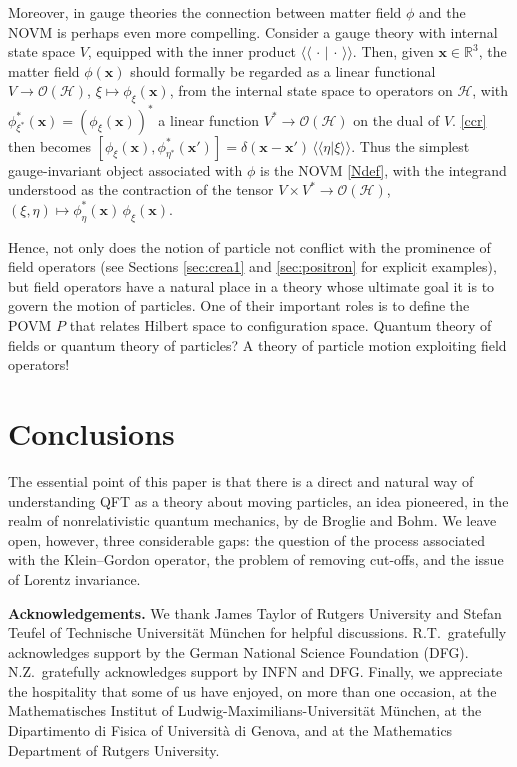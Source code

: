 \documentclass[12pt]{article}
\newcommand{\RRR}{\mathbb{R}} %
\newcommand{\1}{\mathbf{1}} %
\newcommand{\Hilbert}{\mathscr{H}}
\newcommand{\scalar}[2]{\langle\!\langle #1 | #2 \rangle\!\rangle} %
\newcommand{\pov}{{P}}%
\newcommand{\vx}{{\boldsymbol x}} %
\begin{document}
Moreover, in gauge theories the connection between matter field $\phi$
and the NOVM is perhaps even more compelling. Consider a gauge theory
with internal state space $V$, equipped with the inner product
$\scalar{\,\cdot\,}{\,\cdot\,}$. Then, given $\vx \in \RRR^3$, the
matter field $\phi(\vx)$ should formally be regarded as a linear
functional $V \to \mathcal{O}(\Hilbert)$, $\xi \mapsto \phi_\xi(\vx)$,
from the internal state space to operators on $\Hilbert$, with
$\phi^*_{\xi^*}(\vx) = (\phi_\xi(\vx))^*$ a linear function $V^* \to
\mathcal{O}(\Hilbert)$ on the dual of $V$. \eqref{ccr} then becomes
$[\phi_\xi(\vx), \phi_{\eta^*}^*(\vx')] = \delta(\vx-\vx') \,
\scalar{\eta}{\xi}$. Thus the simplest gauge-invariant object
associated with $\phi$ is the NOVM \eqref{Ndef}, with the integrand
understood as the contraction of the tensor $V \times V^* \to
\mathcal{O}(\Hilbert)$, $(\xi,\eta) \mapsto \phi_\eta^*(\vx) \,
\phi_\xi(\vx)$.

Hence, not only does the notion of particle not conflict with the
prominence of field operators (see Sections \ref{sec:crea1} and
\ref{sec:positron} for explicit examples), but field operators have a
natural place in a theory whose ultimate goal it is to govern the
motion of particles.  One of their important roles is to define the
POVM $\pov$ that relates Hilbert space to configuration space.
Quantum theory of fields or quantum theory of particles? A theory of
particle motion exploiting field operators!





\section{Conclusions}

The essential point of this paper is that there is a direct and
natural way of understanding QFT as a theory about moving particles,
an idea pioneered, in the realm of nonrelativistic quantum mechanics,
by de Broglie and Bohm.  We leave open, however, three considerable
gaps: the question of the process associated with the Klein--Gordon
operator, the problem of removing cut-offs, and the issue of Lorentz
invariance.

\bigskip

\noindent \textbf{Acknowledgements. }We thank James Taylor of Rutgers
University and Stefan Teufel of Technische Universit\"at M\"unchen for
helpful discussions.  R.T.\ gratefully acknowledges support by the
German National Science Foundation (DFG).  N.Z.\ gratefully
acknowledges support by INFN and DFG.  Finally, we appreciate the
hospitality that some of us have enjoyed, on more than one occasion,
at the Mathematisches Institut of Ludwig-Maximilians-Universit\"at
M\"unchen, at the Dipartimento di Fisica of Universit\`a di Genova,
and at the Mathematics Department of Rutgers University.
\end{document}
